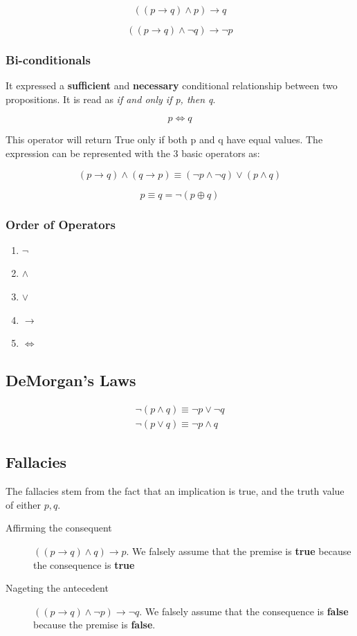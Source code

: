 \documentclass[11pt]{article}
\begin{document}
\[
((p \to q) \land p) \to q
\]

\[
((p \to q) \land \neg q) \to \neg p
\]

\subsubsection{Bi-conditionals}
\label{sec:org7055253}
It expressed a \textbf{sufficient} and \textbf{necessary} conditional relationship between two propositions. It is read as \emph{if and only if p, then q}.

\[
p \Leftrightarrow q
\]

This operator will return True only if both p and q have equal values. The expression can be represented with the 3 basic operators as:

\[
(p \to q) \land (q \to p) \equiv (\neg p \land \neg q) \lor (p \land q)
\]

\[
p \equiv q = \neg (p \oplus q)
\]

\subsubsection{Order of Operators}
\label{sec:orgf67d995}
\begin{enumerate}
\item \(\neg\)
\item \(\land\)
\item \(\lor\)
\item \(\to\)
\item \(\Leftrightarrow\)
\end{enumerate}

\subsection{DeMorgan's Laws}
\label{sec:org284aaa4}
\begin{align}
\neg (p \land q) \equiv \neg p \lor \neg q \\
\neg (p \lor q) \equiv \neg p \land q
\end{align}

\subsection{Fallacies}
\label{sec:orgdd1777c}
The fallacies stem from the fact that an implication is true, and the truth value of either \(p,q\).
\begin{description}
\item[{Affirming the consequent}] \(((p \to q) \land q) \to p\). We falsely assume that the premise is \textbf{true} because the consequence is \textbf{true}
\item[{Nageting the antecedent}] \(((p \to q) \land \neg p) \to \neg q\). We falsely assume that the consequence is \textbf{false} because the premise is \textbf{false}.
\end{description}
\end{document}
